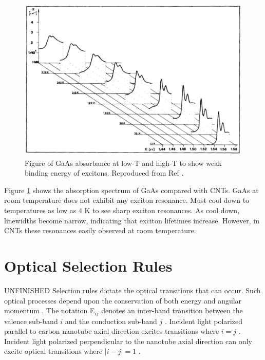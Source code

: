 \begin{figure}[h]
	\centering
	\includegraphics[scale=0.55]{images/chapter_optical_props/gaas_absorbance_filipowicz}
	\caption{Figure of GaAs absorbance at low-T and high-T to show weak binding energy of excitons. Reproduced from Ref \cite{filipowicz1990temperature}.}
	\label{fig:gaas_vs_cnt_absorbance}
\end{figure}

Figure \ref{fig:gaas_vs_cnt_absorbance} shows the absorption spectrum of GaAs compared with CNTs. GaAs at room temperature does not exhibit any exciton resonance. Must cool down to temperatures as low as 4 K to see sharp exciton resonances. As cool down, linewidths become narrow, indicating that exciton lifetimes increase. However, in CNTs these resonances easily observed at room temperature. 




\section{Optical Selection Rules}

{\color{red}UNFINISHED} Selection rules dictate the optical transitions that can occur. Such optical processes depend upon the conservation of both energy and angular momentum \cite{weismanKonoBook}. The notation E$_{ij}$ denotes an inter-band transition between the valence sub-band $i$ and the conduction sub-band $j$ \cite{weismanKonoBook}. Incident light polarized parallel to carbon nanotube axial direction excites transitions where $i=j$ \cite{weismanKonoBook}. Incident light polarized perpendicular to the nanotube axial direction can only excite optical transitions where $|i-j|=1$ \cite{weismanKonoBook}. 

